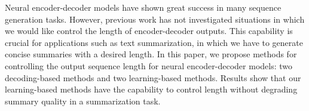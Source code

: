 Neural encoder-decoder models have shown great success in many sequence generation tasks. However, previous work has not investigated situations in which we would like control the length of encoder-decoder outputs. This capability is crucial for applications such as text summarization, in which we have to generate concise summaries with a desired length. In this paper, we propose methods for controlling the output sequence length for neural encoder-decoder models: two decoding-based methods and two learning-based methods. Results show that our learning-based methods have the capability to control length without degrading summary quality in a summarization task.
